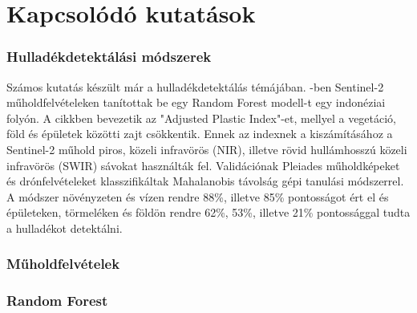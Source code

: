 \chapter{Kapcsolódó kutatások}
\label{ch:related_research}

\subsection{Hulladékdetektálási módszerek}

Számos kutatás készült már a hulladékdetektálás témájában. \cite{sakti2023}-ben Sentinel-2 műholdfelvételeken tanítottak be egy Random Forest modell-t egy indonéziai folyón. A cikkben bevezetik az "Adjusted Plastic Index"-et, mellyel a vegetáció, föld és épületek közötti zajt csökkentik. Ennek az indexnek a kiszámításához a Sentinel-2 műhold piros, közeli infravörös (NIR), illetve rövid hullámhosszú közeli infravörös (SWIR) sávokat használták fel. Validációnak Pleiades műholdképeket és drónfelvételeket klasszifikáltak Mahalanobis távolság gépi tanulási módszerrel. A módszer növényzeten és vízen rendre 88\%, illetve 85\% pontosságot ért el és épületeken, törmeléken és földön rendre 62\%, 53\%, illetve 21\% pontossággal tudta a hulladékot detektálni.



\subsection{Műholdfelvételek}

\subsection{Random Forest}

